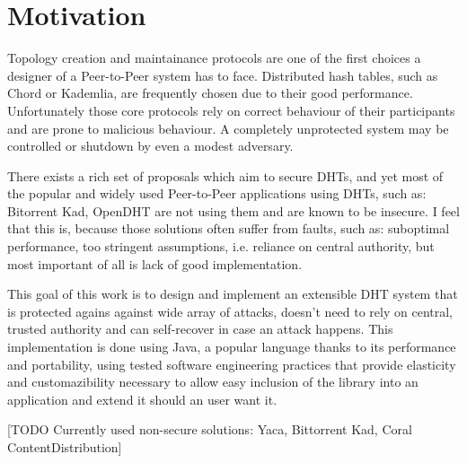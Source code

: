\chapter{Motivation}
Topology creation and maintainance protocols are one of the first choices a
designer of a Peer-to-Peer system has to face. Distributed hash tables, such as
Chord or Kademlia, are frequently chosen due to their good performance.
Unfortunately those core protocols rely on correct behaviour of their
participants and are prone to malicious behaviour. A completely unprotected
system may be controlled or shutdown by even a modest adversary.

There exists a rich set of proposals which aim to secure DHTs, and yet most of
the popular and widely used Peer-to-Peer applications using DHTs, such as:
Bitorrent Kad, OpenDHT are not using them and are known to be insecure. I feel
that this is, because those solutions often suffer from faults, such as:
suboptimal performance, too stringent assumptions, i.e. reliance on central
authority, but most important of all is lack of good implementation.

This goal of this work is to design and implement an extensible DHT system
that is protected agains against wide array of attacks, doesn't need to rely on
central, trusted authority and can self-recover in case an attack happens. This
implementation is done using Java, a popular language thanks to its performance
and portability, using tested software engineering practices that provide
elasticity and customazibility necessary to allow easy inclusion of the library
into an application and extend it should an user want it.

[TODO Currently used non-secure solutions: Yaca, Bittorrent Kad, Coral
ContentDistribution]
